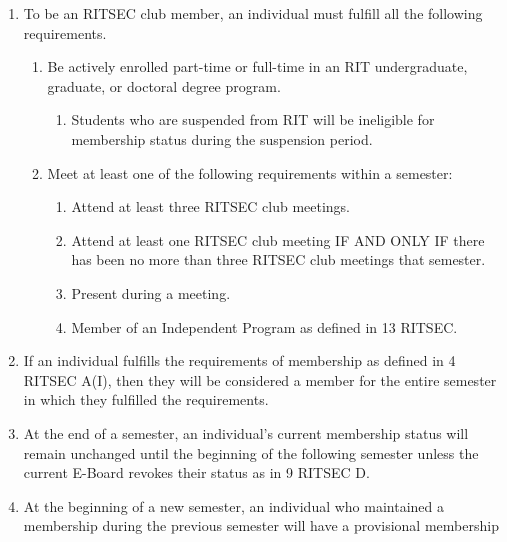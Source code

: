 


\begin{enumerate}
  \item To be an RITSEC club member, an individual must fulfill all the
    following requirements.
  \begin{enumerate}
    \item Be actively enrolled part-time or full-time in an RIT undergraduate,
      graduate, or doctoral degree program.
    \begin{enumerate}
      \item Students who are suspended from RIT will be ineligible for
        membership status during the suspension period.
    \end{enumerate}
    \item Meet at least one of the following requirements within a semester:
    \begin{enumerate}
      \item Attend at least three RITSEC club meetings.
      \item Attend at least one RITSEC club meeting IF AND ONLY IF there has
        been no more than three RITSEC club meetings that semester.
      \item Present during a meeting.
      \item Member of an Independent Program as defined in 13 RITSEC.
    \end{enumerate}
  \end{enumerate}
  \item If an individual fulfills the requirements of membership as defined in
    4 RITSEC A(I), then they will be considered a member for the entire
    semester in which they fulfilled the requirements.
  \item At the end of a semester, an individual's current membership status
    will remain unchanged until the beginning of the following semester unless
    the current E-Board revokes their status as in 9 RITSEC D.
  \item At the beginning of a new semester, an individual who maintained a
    membership during the previous semester will have a provisional membership

\end{enumerate}
